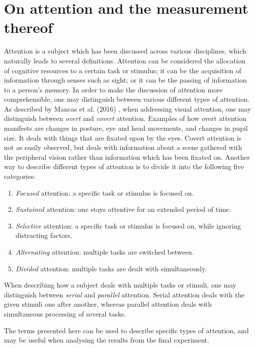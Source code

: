 \chapter{On attention and the measurement thereof}\label{ch:attention}
Attention is a subject which has been discussed across various disciplines, which naturally leads to several definitions. Attention can be considered the allocation of cognitive resources to a certain task or stimulus; it can be the acquisition of information through senses such as sight; or it can be the passing of information to a person’s memory. In order to make the discussion of attention more comprehensible, one may distinguish between various different types of attention. As described by Mancas et al. (2016) \cite{Mancas2016}, when addressing visual attention, one may distinguish between \textit{overt} and \textit{covert} attention. Examples of how overt attention manifests are changes in posture, eye and head movements, and changes in pupil size. It deals with things that are fixated upon by the eyes. Covert attention is not as easily observed, but deals with information about a scene gathered with the peripheral vision rather than information which has been fixated on. Another way to describe different types of attention is to divide it into the following five categories:

\begin{enumerate}
\item \textit{Focused} attention: a specific task or stimulus is focused on.
\item \textit{Sustained} attention: one stays attentive for an extended period of time.
\item \textit{Selective} attention: a specific task or stimulus is focused on, while ignoring distracting factors.
\item \textit{Alternating} attention: multiple tasks are switched between.
\item \textit{Divided} attention: multiple tasks are dealt with simultaneously.
\end{enumerate}

When describing how a subject deals with multiple tasks or stimuli, one may distinguish between \textit{serial} and \textit{parallel} attention. Serial attention deals with the given stimuli one after another, whereas parallel attention deals with simultaneous processing of several tasks.

The terms presented here can be used to describe specific types of attention, and may be useful when analysing the results from the final experiment.

